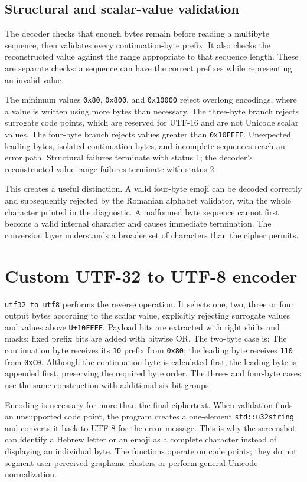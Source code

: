 \documentclass{utmreport}
\newcommand{\sourceexcerpt}[2]{\VerbatimInput[firstline=#1,lastline=#2]{../src/main.cpp}}
\begin{document}
\subsection{Structural and scalar-value validation}
The decoder checks that enough bytes remain before reading a multibyte sequence, then validates every continuation-byte prefix. It also checks the reconstructed value against the range appropriate to that sequence length. These are separate checks: a sequence can have the correct prefixes while representing an invalid value.

The minimum values \texttt{0x80}, \texttt{0x800}, and \texttt{0x10000} reject overlong encodings, where a value is written using more bytes than necessary. The three-byte branch rejects surrogate code points, which are reserved for UTF-16 and are not Unicode scalar values. The four-byte branch rejects values greater than \texttt{0x10FFFF}. Unexpected leading bytes, isolated continuation bytes, and incomplete sequences reach an error path. Structural failures terminate with status 1; the decoder's reconstructed-value range failures terminate with status 2.

This creates a useful distinction. A valid four-byte emoji can be decoded correctly and subsequently rejected by the Romanian alphabet validator, with the whole character printed in the diagnostic. A malformed byte sequence cannot first become a valid internal character and causes immediate termination. The conversion layer understands a broader set of characters than the cipher permits.

\section{Custom UTF-32 to UTF-8 encoder}
\texttt{utf32\_to\_utf8} performs the reverse operation. It selects one, two, three or four output bytes according to the scalar value, explicitly rejecting surrogate values and values above \texttt{U+10FFFF}. Payload bits are extracted with right shifts and masks; fixed prefix bits are added with bitwise OR. The two-byte case is:
\sourceexcerpt{135}{138}
The continuation byte receives its \texttt{10} prefix from \texttt{0x80}; the leading byte receives \texttt{110} from \texttt{0xC0}. Although the continuation byte is calculated first, the leading byte is appended first, preserving the required byte order. The three- and four-byte cases use the same construction with additional six-bit groups.

Encoding is necessary for more than the final ciphertext. When validation finds an unsupported code point, the program creates a one-element \texttt{std::u32string} and converts it back to UTF-8 for the error message. This is why the screenshot can identify a Hebrew letter or an emoji as a complete character instead of displaying an individual byte. The functions operate on code points; they do not segment user-perceived grapheme clusters or perform general Unicode normalization.
\end{document}
